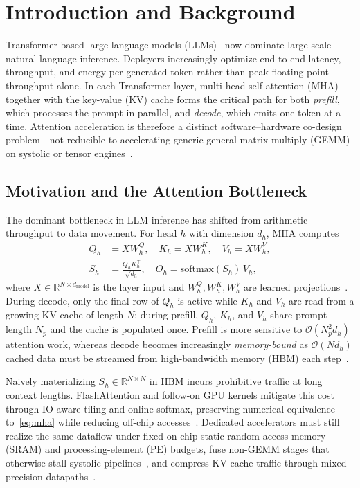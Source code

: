 \documentclass[conference]{IEEEtran}
\begin{document}
\section{Introduction and Background}
\label{sec:intro}

Transformer-based large language models (LLMs)~\cite{vaswani2017attention} now dominate large-scale natural-language inference.
Deployers increasingly optimize end-to-end latency, throughput, and energy per generated token rather than peak floating-point throughput alone.
In each Transformer layer, multi-head self-attention (MHA) together with the key-value (KV) cache forms the critical path for both \emph{prefill}, which processes the prompt in parallel, and \emph{decode}, which emits one token at a time.
Attention acceleration is therefore a distinct software--hardware co-design problem---not reducible to accelerating generic general matrix multiply (GEMM) on systolic or tensor engines~\cite{chen2016eyeriss,ma2024tpuv4i}.

\subsection{Motivation and the Attention Bottleneck}
\label{sec:intro-motivation}

The dominant bottleneck in LLM inference has shifted from arithmetic throughput to data movement.
For head $h$ with dimension $d_h$, MHA computes
\begin{align}
Q_h &= X W^Q_h,\quad K_h = X W^K_h,\quad V_h = X W^V_h, \nonumber\\
S_h &= \frac{Q_h K_h^\top}{\sqrt{d_h}},\quad
O_h = \mathrm{softmax}(S_h)\,V_h,
\label{eq:mha}
\end{align}
where $X \in \mathbb{R}^{N \times d_{\mathrm{model}}}$ is the layer input and $W^Q_h, W^K_h, W^V_h$ are learned projections~\cite{vaswani2017attention}.
During decode, only the final row of $Q_h$ is active while $K_h$ and $V_h$ are read from a growing KV cache of length $N$; during prefill, $Q_h$, $K_h$, and $V_h$ share prompt length $N_p$ and the cache is populated once.
Prefill is more sensitive to $\mathcal{O}(N_p^2 d_h)$ attention work, whereas decode becomes increasingly \emph{memory-bound} as $\mathcal{O}(N d_h)$ cached data must be streamed from high-bandwidth memory (HBM) each step~\cite{dao2022flashattention,dao2023flashdecoding,bitdecoding2026}.

Naively materializing $S_h \in \mathbb{R}^{N \times N}$ in HBM incurs prohibitive traffic at long context lengths.
FlashAttention and follow-on GPU kernels mitigate this cost through IO-aware tiling and online softmax, preserving numerical equivalence to~\eqref{eq:mha} while reducing off-chip accesses~\cite{dao2022flashattention,dao2023flashattention2,shah2024flashattention3}.
Dedicated accelerators must still realize the same dataflow under fixed on-chip static random-access memory (SRAM) and processing-element (PE) budgets, fuse non-GEMM stages that otherwise stall systolic pipelines~\cite{wang2023cosa,desa2025}, and compress KV cache traffic through mixed-precision datapaths~\cite{liu2024kivi,sawint42026,bitdecoding2026}.
\end{document}
